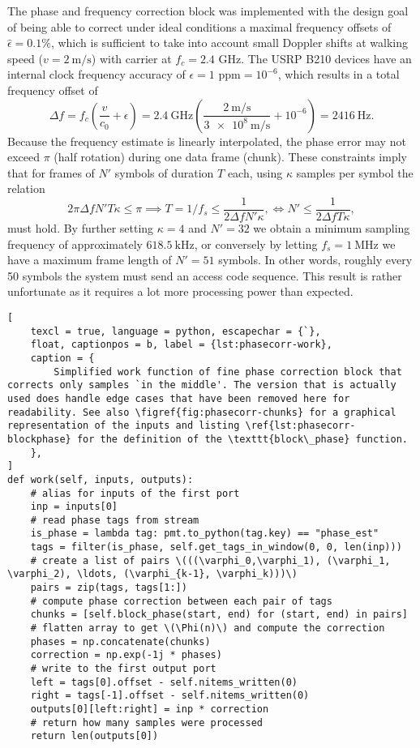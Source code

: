 The phase and frequency correction block was implemented with the design goal of being able to correct under ideal conditions a maximal frequency offsets of \(\hat{\epsilon} = 0.1\%\), which is sufficient to take into account small Doppler shifts at walking speed (\(v = \SI{2}{\meter\per\second}\)) with carrier at \(f_c = 2.4\) GHz. The USRP B210 devices have an internal clock frequency accuracy of \(\epsilon = 1\text{ ppm} = 10^{-6}\), which results in a total frequency offset of
\begin{equation}\label{eq:doppler}
	\Delta f = f_c \left( \frac{v}{c_0} + \epsilon \right)
	= \SI{2.4}{\giga\hertz} \left(
		\frac{\SI{2}{\meter\per\second}}{\SI{3e8}{\meter\per\second}} + 10^{-6} 
	\right) = \SI{2416}{\hertz}.
\end{equation}
Because the frequency estimate is linearly interpolated, the phase error may not exceed \(\pi\) (half rotation) during one data frame (chunk). These constraints imply that for frames of \(N'\) symbols of duration \(T\) each, using \(\kappa\) samples per symbol the relation
\begin{equation}\label{Doppler-shift}
	2\pi\Delta f N' T \kappa \leq \pi
	\implies T = 1/f_s \leq \frac{1}{2\Delta f N' \kappa},
	\iff N' \leq \frac{1}{2\Delta f T \kappa},
\end{equation}
must hold. By further setting \(\kappa = 4\) and \(N' = 32\) we obtain a minimum sampling frequency of approximately \(\SI{618.5}{\kilo\hertz}\), or conversely by letting \(f_s = \SI{1}{\mega\hertz}\) we have a maximum frame length of \(N' = 51\) symbols. In other words, roughly every 50 symbols the system must send an access code sequence. This result is rather unfortunate as it requires a lot more processing power than expected.

\begin{lstlisting}[
	texcl = true, language = python, escapechar = {`},
	float, captionpos = b, label = {lst:phasecorr-work},
	caption = {
		Simplified work function of fine phase correction block that corrects only samples `in the middle'. The version that is actually used does handle edge cases that have been removed here for readability. See also \figref{fig:phasecorr-chunks} for a graphical representation of the inputs and listing \ref{lst:phasecorr-blockphase} for the definition of the \texttt{block\_phase} function.
	},
]
def work(self, inputs, outputs):
	# alias for inputs of the first port
	inp = inputs[0]
	# read phase tags from stream
	is_phase = lambda tag: pmt.to_python(tag.key) == "phase_est"
	tags = filter(is_phase, self.get_tags_in_window(0, 0, len(inp)))
	# create a list of pairs \(((\varphi_0,\varphi_1), (\varphi_1, \varphi_2), \ldots, (\varphi_{k-1}, \varphi_k)))\)
	pairs = zip(tags, tags[1:])
	# compute phase correction between each pair of tags
	chunks = [self.block_phase(start, end) for (start, end) in pairs]
	# flatten array to get \(\Phi(n)\) and compute the correction
	phases = np.concatenate(chunks)
	correction = np.exp(-1j * phases) 
	# write to the first output port
	left = tags[0].offset - self.nitems_written(0)
	right = tags[-1].offset - self.nitems_written(0)
	outputs[0][left:right] = inp * correction
	# return how many samples were processed
	return len(outputs[0])
\end{lstlisting}

